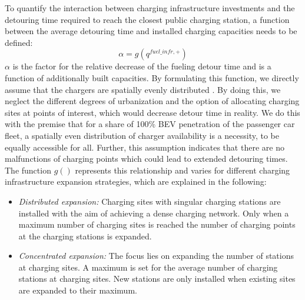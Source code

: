 \documentclass[preprint,review,11pt, authoryear]{elsarticle}
\begin{document}
                To quantify the interaction between charging infrastructure investments and the detouring time required to reach the closest public charging station, a function between the average detouring time and installed charging capacities needs to be defined: 
                \begin{equation}
                    \alpha = g\left(q^{fuel\_infr, +}\right)
                \end{equation}
                $\alpha$ is the factor for the relative decrease of the fueling detour time and is a function of additionally built capacities. By formulating this function, we directly assume that the chargers are spatially evenly distributed . By doing this, we neglect the different degrees of urbanization and the option of allocating charging sites at points of interest, which would decrease detour time in reality. We do this with the premise that for a share of 100\% BEV penetration of the passenger car fleet, a spatially even distribution of charger availability is a necessity, to be equally accessible for all. Further, this assumption indicates that there are no malfunctions of charging points which could lead to extended detouring times.  
                The function $g()$ represents this relationship and varies for different charging infrastructure expansion strategies, which are explained in the following:

                \begin{itemize}
                
                   
                    
                    \item \textit{Distributed expansion:} Charging sites with singular charging stations are installed with the aim of achieving a dense charging network. Only when a maximum number of charging sites is reached the number of charging points at the charging stations is expanded.

                     \item \textit{Concentrated expansion:} The focus lies on expanding the number of stations at charging sites. A maximum is set for the average number of charging stations at charging sites. New stations are only installed when existing sites are expanded to their maximum.

                
                \end{itemize}
               
\end{document}
